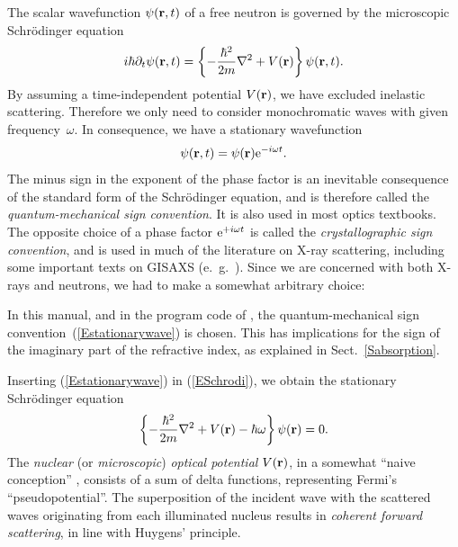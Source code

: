 %
The scalar wavefunction $\psi(\mathbf{r},t)$
%
%
%
of a free neutron
is governed by the microscopic Schrödinger equation
\begin{equation}\label{ESchrodi}
  i\hbar\partial_t \psi(\mathbf{r},t)
  = \left\{-\frac{\hbar^2}{2m}\mathbf{\nabla}^2+V(\mathbf{r})\right\} \psi(\mathbf{r},t).
\end{equation}
By assuming a time-independent potential $V(\mathbf{r})$,
we have excluded inelastic scattering.
Therefore we only need to consider monochromatic waves
with given frequency~$\omega$.
%
In consequence, we have a stationary wavefunction
\begin{equation}\label{Estationarywave}
  \psi(\mathbf{r},t) = \psi(\mathbf{r})\text{e}^{-i\omega t}.
\end{equation}
%
The minus sign in the exponent of the phase factor
is an inevitable consequence of the standard form of the Schrödinger equation,
and is therefore called the \textit{quantum-mechanical sign convention}.
It is also used in most optics textbooks.
%
%
The opposite choice of a phase factor $\text{e}^{+i\omega t}$ is 
called the \textit{crystallographic sign convention},
and is used in much of the literature on X-ray scattering,
including some important texts on GISAXS (e.~g.\ \cite{ReLL09}).
Since we are concerned with both X-rays and neutrons,
we had to make a somewhat arbitrary choice:

\Note
{\indent In this manual, and in the program code of \BornAgain,
the quantum-mechanical sign convention~(\ref{Estationarywave}) is chosen.
This has implications for the sign of the imaginary part of the
refractive index,
%
as explained in Sect.~\ref{Sabsorption}.}

Inserting (\ref{Estationarywave}) in (\ref{ESchrodi}),
we obtain the stationary Schrödinger equation
\begin{equation}\label{EstatSchrodi}
  \left\{-\frac{\hbar^2}{2m}\mathbf{\nabla}^2+V(\mathbf{r})-\hbar\omega\right\} \psi(\mathbf{r}) = 0.
\end{equation}
%
%
%
%
The \textit{nuclear} (or \textit{microscopic})
\textit{optical potential} $V(\mathbf{r})$,
in a somewhat ``naive conception'' \cite[p.~7]{Sea89},
consists of a sum of delta functions,
representing Fermi's ``pseudopotential''.
%
The superposition of the incident wave with the scattered waves
originating from each illuminated nucleus
results in \textit{coherent forward scattering},
%
in line with Huygens' principle.
%

